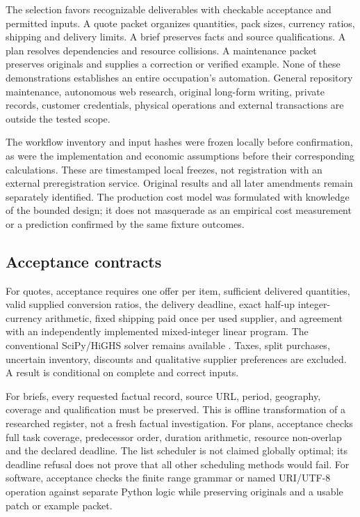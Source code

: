 The selection favors recognizable deliverables with checkable acceptance and permitted inputs. A quote packet organizes quantities, pack sizes, currency ratios, shipping and delivery limits. A brief preserves facts and source qualifications. A plan resolves dependencies and resource collisions. A maintenance packet preserves originals and supplies a correction or verified example. None of these demonstrations establishes an entire occupation's automation. General repository maintenance, autonomous web research, original long-form writing, private records, customer credentials, physical operations and external transactions are outside the tested scope.

The workflow inventory and input hashes were frozen locally before confirmation, as were the implementation and economic assumptions before their corresponding calculations. These are timestamped local freezes, not registration with an external preregistration service. Original results and all later amendments remain separately identified. The production cost model was formulated with knowledge of the bounded design; it does not masquerade as an empirical cost measurement or a prediction confirmed by the same fixture outcomes.

\subsection{Acceptance contracts}

For quotes, acceptance requires one offer per item, sufficient delivered quantities, valid supplied conversion ratios, the delivery deadline, exact half-up integer-currency arithmetic, fixed shipping paid once per used supplier, and agreement with an independently implemented mixed-integer linear program. The conventional SciPy/HiGHS solver remains available \cite{scipymilp}. Taxes, split purchases, uncertain inventory, discounts and qualitative supplier preferences are excluded. A result is conditional on complete and correct inputs.

For briefs, every requested factual record, source URL, period, geography, coverage and qualification must be preserved. This is offline transformation of a researched register, not a fresh factual investigation. For plans, acceptance checks full task coverage, predecessor order, duration arithmetic, resource non-overlap and the declared deadline. The list scheduler is not claimed globally optimal; its deadline refusal does not prove that all other scheduling methods would fail. For software, acceptance checks the finite range grammar or named URI/UTF-8 operation against separate Python logic while preserving originals and a usable patch or example packet.

